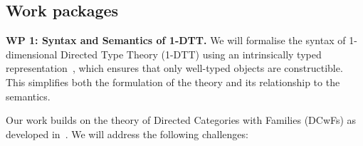 \documentclass[a4paper,11pt]{article}
\renewcommand{\paragraph}[1]{\textbf{#1.}}
\begin{document}
\subsection{Work packages}\label{work-packages}%




\paragraph{WP 1: Syntax and Semantics of 1-DTT}
We will formalise the syntax of 1-dimensional Directed Type Theory
(1-DTT) using an intrinsically typed
representation~\cite{altenkirch2016type}, which ensures that only
well-typed objects are constructible. This simplifies both the
formulation of the theory and its relationship to the semantics. 

Our work builds on the theory of Directed Categories with Families
(DCwFs) as developed in~\cite{altenkirch_neumann_2024}. We will address the
following challenges: 
\end{document}

